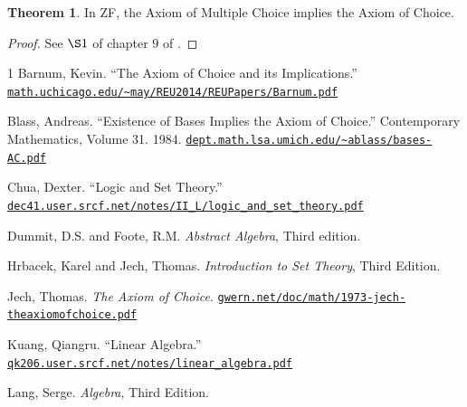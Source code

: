\documentclass[12pt]{article}
\theoremstyle{definition}
\newtheorem*{theorem}{\color{blue} Theorem}
\newcommand\conciseLink[1]{\href{https://#1}{\nolinkurl{#1}}}
\begin{document}
\begin{theorem}
	In ZF, the Axiom of Multiple Choice implies the Axiom of Choice.
\end{theorem}
\begin{proof}
	See $\S1$ of chapter $9$ of \cite{Jech}.
\end{proof}


\clearpage


\begin{thebibliography}{1}
	 Barnum, Kevin. ``The Axiom of Choice and its Implications.'' \conciseLink{math.uchicago.edu/~may/REU2014/REUPapers/Barnum.pdf}
	
	 Blass, Andreas. ``Existence of Bases Implies the Axiom of Choice.'' Contemporary Mathematics, Volume 31. 1984. \conciseLink{dept.math.lsa.umich.edu/~ablass/bases-AC.pdf}
	
	 Chua, Dexter. ``Logic and Set Theory.'' \conciseLink{dec41.user.srcf.net/notes/II_L/logic_and_set_theory.pdf}
	
	 Dummit, D.S. and Foote, R.M. \emph{Abstract Algebra}, Third edition.
	
	 Hrbacek, Karel and Jech, Thomas. \emph{Introduction to Set Theory}, Third Edition.%
	
	 Jech, Thomas. \emph{The Axiom of Choice}. \conciseLink{gwern.net/doc/math/1973-jech-theaxiomofchoice.pdf}
	
	 Kuang, Qiangru. ``Linear Algebra.'' \conciseLink{qk206.user.srcf.net/notes/linear_algebra.pdf}
	
	 Lang, Serge. \emph{Algebra}, Third Edition.
\end{thebibliography}
\end{document}
